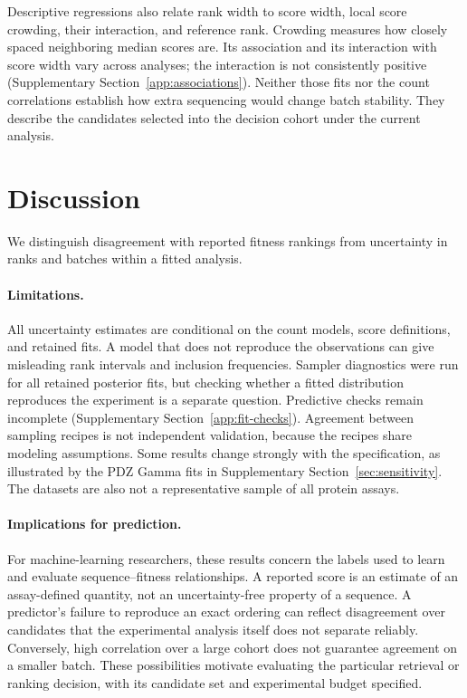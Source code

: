\documentclass[11pt]{article}
\begin{document}
Descriptive regressions also relate rank width to score width,
local score crowding, their interaction, and reference rank.
Crowding measures how closely spaced neighboring median scores
are. Its association and its interaction with score width vary
across analyses; the interaction is not consistently positive
(Supplementary Section~\ref{app:associations}). Neither those fits
nor the count correlations establish how extra sequencing would
change batch stability. They describe the candidates selected into
the decision cohort under the current analysis.

\section{Discussion}
\label{sec:discussion}

We distinguish disagreement with reported fitness rankings from
uncertainty in ranks and batches within a fitted analysis.

\paragraph{Limitations.}
All uncertainty estimates are conditional on the count models,
score definitions, and retained fits. A model that does not
reproduce the observations can give misleading rank intervals
and inclusion frequencies. Sampler diagnostics were run for all retained
posterior fits, but checking whether a fitted distribution reproduces the experiment
is a separate question. Predictive checks remain incomplete
(Supplementary Section~\ref{app:fit-checks}). Agreement between
sampling recipes is not independent validation, because the
recipes share modeling assumptions. Some results change strongly
with the specification, as illustrated by the PDZ Gamma fits
in Supplementary Section~\ref{sec:sensitivity}. The datasets are
also not a representative sample of all protein assays.

\paragraph{Implications for prediction.}
For machine-learning researchers, these results concern the labels
used to learn and evaluate sequence--fitness relationships. A
reported score is an estimate of an assay-defined quantity, not
an uncertainty-free property of a sequence. A predictor's failure
to reproduce an exact ordering can reflect disagreement over
candidates that the experimental analysis itself does not separate
reliably. Conversely, high correlation over a large cohort does
not guarantee agreement on a smaller batch. These possibilities
motivate evaluating the particular retrieval or ranking decision,
with its candidate set and experimental budget specified.
\end{document}
